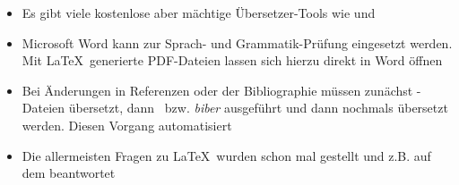 \smallskip
\begin{itemize}[label={\faLightbulbO}]
    \item Es gibt viele kostenlose aber mächtige Übersetzer-Tools wie  und 
    \item Microsoft Word kann zur Sprach- und Grammatik-Prüfung eingesetzt werden. Mit \LaTeX\ generierte PDF-Dateien lassen sich hierzu direkt in Word öffnen
    \item Bei Änderungen in Referenzen oder der Bibliographie müssen zunächst -Dateien übersetzt, dann \bibtex\ bzw. \emph{biber} ausgeführt und dann nochmals übersetzt werden. Diesen Vorgang automatisiert 
    \item Die allermeisten Fragen zu \LaTeX\ wurden schon mal gestellt und z.B. auf dem  beantwortet
\end{itemize}

